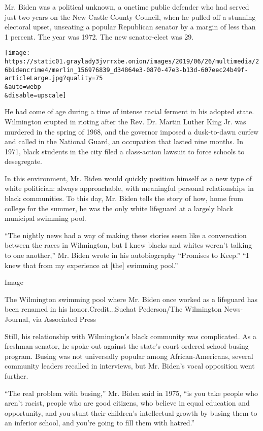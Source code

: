 Mr. Biden was a political unknown, a onetime public defender who had
served just two years on the New Castle County Council, when he pulled
off a stunning electoral upset, unseating a popular Republican senator
by a margin of less than 1 percent. The year was 1972. The new
senator-elect was 29.

\texttt{[image: https://static01.graylady3jvrrxbe.onion/images/2019/06/26/multimedia/26bidencrime4/merlin\_156976839\_d34864e3-0870-47e3-b13d-607eec24b49f-articleLarge.jpg?quality=75\\\&auto=webp\\\&disable=upscale]}

He had come of age during a time of intense racial ferment in his
adopted state. Wilmington erupted in rioting after the Rev. Dr. Martin
Luther King Jr. was murdered in the spring of 1968, and the governor
imposed a dusk-to-dawn curfew and called in the National Guard, an
occupation that lasted nine months. In 1971, black students in the city
filed a class-action lawsuit to force schools to desegregate.

In this environment, Mr. Biden would quickly position himself as a new
type of white politician: always approachable, with meaningful personal
relationships in black communities. To this day, Mr. Biden tells the
story of how, home from college for the summer, he was the only white
lifeguard at a largely black municipal swimming pool.

``The nightly news had a way of making these stories seem like a
conversation between the races in Wilmington, but I knew blacks and
whites weren't talking to one another,'' Mr. Biden wrote in his
autobiography ``Promises to Keep.'' ``I knew that from my experience at
{[}the{]} swimming pool.''

Image

The Wilmington swimming pool where Mr. Biden once worked as a lifeguard
has been renamed in his honor.Credit...Suchat Pederson/The Wilmington
News-Journal, via Associated Press

Still, his relationship with Wilmington's black community was
complicated. As a freshman senator, he spoke out against the state's
court-ordered school-busing program. Busing was not universally popular
among African-Americans, several community leaders recalled in
interviews, but Mr. Biden's vocal opposition went further.

``The real problem with busing,'' Mr. Biden said in 1975, ``is you take
people who aren't racist, people who are good citizens, who believe in
equal education and opportunity, and you stunt their children's
intellectual growth by busing them to an inferior school, and you're
going to fill them with hatred.''

